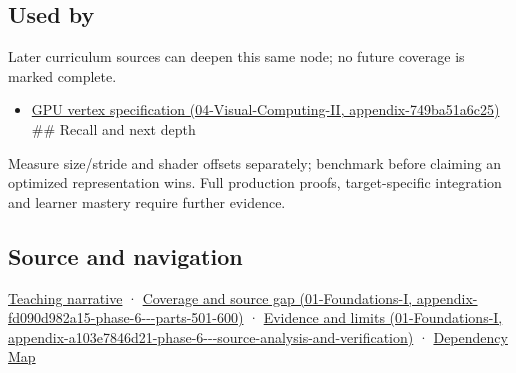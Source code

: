 \subsection{Used by}\label{appendix-26bf6bf2fb8b-used-by}

Later curriculum sources can deepen this same node; no future coverage is marked complete.

\begin{itemize}
\tightlist
\item
  \href{../04-Visual-Computing-II/main.pdf\#nameddest=appendix-749ba51a6c25}{GPU vertex specification (04-Visual-Computing-II, appendix-749ba51a6c25)} \#\# Recall and next depth
\end{itemize}

Measure size/stride and shader offsets separately; benchmark before claiming an optimized representation wins. Full production proofs, target-specific integration and learner mastery require further evidence.

\subsection{Source and navigation}\label{appendix-26bf6bf2fb8b-source-and-navigation}

\hyperref[02-foundations-ii-ch037-storage-and-computation-can-choose-different-layouts]{Teaching narrative} · \href{../01-Foundations-I/main.pdf\#nameddest=appendix-fd090d982a15-phase-6---parts-501-600}{Coverage and source gap (01-Foundations-I, appendix-fd090d982a15-phase-6-\/-\/-parts-501-600)} · \href{../01-Foundations-I/main.pdf\#nameddest=appendix-a103e7846d21-phase-6---source-analysis-and-verification}{Evidence and limits (01-Foundations-I, appendix-a103e7846d21-phase-6-\/-\/-source-analysis-and-verification)} · \hyperref[appendix-4ad47bdd269a]{Dependency Map}
